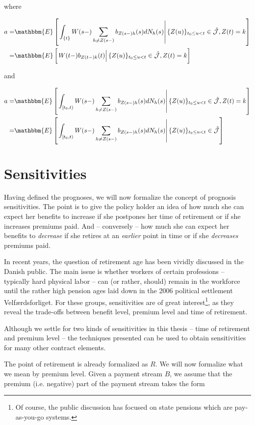\documentclass{book}
\newcommand{\1}[1]{\mathbbm{1}_{\left\lbrace #1 \right\rbrace}}
\newcommand{\econd}[2][def]{\mathbbm{E} \left[ \left. #1 \right| #2 \right]}
\theoremstyle{break}
\theoremstyle{remark}
\numberwithin{equation}{section}
\begin{document}
where

\begin{align*}
	a =& \econd[\int_{\{t\}} W(s-) \sum_{h \neq Z(s-)} b_{Z(s-)h}(s) dN_h(s)]{ \{ Z(u) \}_{t_0 \leq u < t} \in \hat{\mathcal{J}}, Z(t) = k} \\
	=& \econd[W(t-) b_{Z(t-)k}(t)]{ \{ Z(u) \}_{t_0 \leq u < t} \in \hat{\mathcal{J}}, Z(t) = k} 
\end{align*}

and

\begin{align*}
	a =& \econd[\int_{[t_0,t)} W(s-) \sum_{h \neq Z(s-)} b_{Z(s-)h}(s) dN_h(s)]{ \{ Z(u) \}_{t_0 \leq u < t} \in \hat{\mathcal{J}}, Z(t) = k} \\
	=& \econd[\int_{[t_0,t)} W(s-) \sum_{h \neq Z(s-)} b_{Z(s-)h}(s) dN_h(s)]{ \{ Z(u) \}_{t_0 \leq u < t} \in \hat{\mathcal{J}}}
\end{align*}

\chapter{Sensitivities}

Having defined the prognoses, we will now formalize the concept of prognosis sensitivities. The point is to give the policy holder an idea of how much she can expect her benefits to increase if she postpones her time of retirement or if she increases premiums paid. And -- conversely -- how much she can expect her benefits to \textit{decrease} if she retires at an \textit{earlier} point in time or if she \textit{decreases} premiums paid.

In recent years, the question of retirement age has been vividly discussed in the Danish public. The main issue is whether workers of certain professions -- typically hard physical labor -- can (or rather, should) remain in the workforce until the rather high pension ages laid down in the 2006 political settlement Velfærdsforliget. For these groups, sensitivities are of great interest\footnote{Of course, the public discussion has focused on state pensions which are pay-as-you-go systems.}, as they reveal the trade-offs between benefit level, premium level and time of retirement.

Although we settle for two kinds of sensitivities in this thesis -- time of retirement and premium level -- the techniques presented can be used to obtain sensitivities for many other contract elements.

The point of retirement is already formalized as $R$. We will now formalize what we mean by premium level. Given a payment stream $B$, we assume that the premium (i.e. negative) part of the payment stream takes the form
\end{document}
